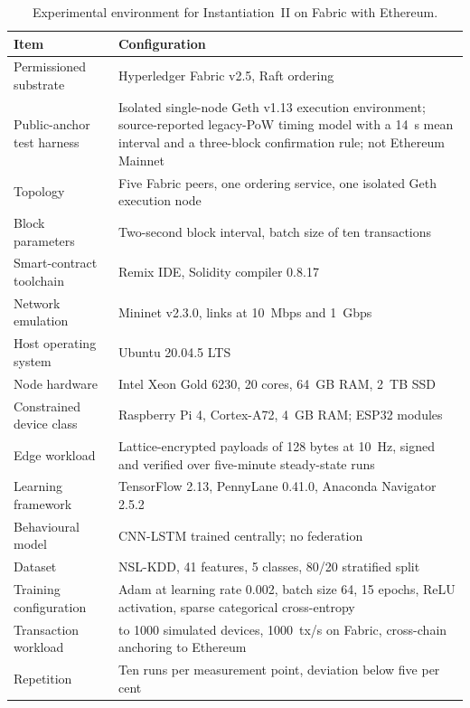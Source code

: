 \begin{table}[!htbp]
  \centering
  \footnotesize
  \setlength{\tabcolsep}{5pt}
  \renewcommand{\arraystretch}{1.3}
  \caption{Experimental environment for Instantiation~II on Fabric with Ethereum.}
  \label{tab:env-instantiation-ii}
  \begin{tabularx}{\textwidth}{@{}
      >{\raggedright\arraybackslash}p{4.4cm}
      >{\raggedright\arraybackslash}X@{}}
    \toprule
    \textbf{Item} & \textbf{Configuration} \\
    \midrule
    Permissioned substrate & Hyperledger Fabric v2.5, Raft ordering \\
    Public-anchor test harness & Isolated single-node Geth v1.13 execution environment; source-reported legacy-PoW timing model with a 14~s mean interval and a three-block confirmation rule; not Ethereum Mainnet \\
    Topology & Five Fabric peers, one ordering service, one isolated Geth execution node \\
    Block parameters & Two-second block interval, batch size of ten transactions \\
    Smart-contract toolchain & Remix IDE, Solidity compiler 0.8.17 \\
    Network emulation & Mininet v2.3.0, links at 10~Mbps and 1~Gbps \\
    Host operating system & Ubuntu 20.04.5 LTS \\
    Node hardware & Intel Xeon Gold 6230, 20 cores, 64~GB RAM, 2~TB SSD \\
    Constrained device class & Raspberry Pi 4, Cortex-A72, 4~GB RAM; ESP32 modules \\
    Edge workload & Lattice-encrypted payloads of 128 bytes at 10~Hz, signed and verified over five-minute steady-state runs \\
    Learning framework & TensorFlow 2.13, PennyLane 0.41.0, Anaconda Navigator 2.5.2 \\
    Behavioural model & CNN-LSTM trained centrally; no federation \\
    Dataset & NSL-KDD, 41 features, 5 classes, 80/20 stratified split \\
    Training configuration & Adam at learning rate 0.002, batch size 64, 15 epochs, ReLU activation, sparse categorical cross-entropy \\
    Transaction workload & 100 to 1000 simulated devices, 1000~tx/s on Fabric, cross-chain anchoring to Ethereum \\
    Repetition & Ten runs per measurement point, deviation below five per cent \\
    \bottomrule
  \end{tabularx}
\end{table}

